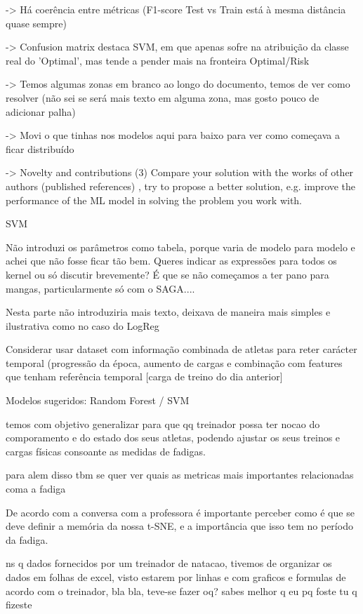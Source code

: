 \documentclass[conference]{IEEEtran}
\begin{document}
-> Há coerência entre métricas (F1-score Test vs Train está à mesma distância quase sempre)

-> Confusion matrix destaca SVM, em que apenas sofre na atribuição da classe real do 'Optimal', mas tende a pender mais na fronteira Optimal/Risk

-> Temos algumas zonas em branco ao longo do documento, temos de ver como resolver (não sei se será mais texto em alguma zona, mas gosto pouco de adicionar palha)

-> Movi o que tinhas nos modelos aqui para baixo para ver como começava a ficar distribuído

-> Novelty and contributions (3) Compare your solution with the works of other authors (published references) , try to propose a better solution, e.g. improve the performance of the ML model in solving the problem you work with.

SVM

Não introduzi os parâmetros como tabela, porque varia de modelo para modelo e achei que não fosse ficar tão bem. Queres indicar as expressões para todos os kernel ou só discutir brevemente? É que se não começamos a ter pano para mangas, particularmente só com o SAGA....

Nesta parte não introduziria mais texto, deixava de maneira mais simples e ilustrativa como no caso do LogReg


Considerar usar dataset com informação combinada de atletas para reter carácter temporal (progressão da época, aumento de cargas e combinação com features que tenham referência temporal [carga de treino do dia anterior]

Modelos sugeridos: Random Forest / SVM

temos com objetivo generalizar para que qq treinador possa ter nocao do comporamento e do estado dos seus atletas, podendo ajustar os seus treinos e cargas físicas consoante as medidas de fadigas.

para alem disso tbm se quer ver quais as metricas mais importantes relacionadas coma a fadiga

De acordo com a conversa com a professora é importante perceber como é que se deve definir a memória da nossa t-SNE, e a importância que isso tem no período da fadiga.

ns q dados fornecidos por um treinador de natacao, tivemos de organizar os dados em folhas de excel, visto estarem por linhas e com graficos e formulas de acordo com o treinador, bla bla, teve-se fazer oq? sabes melhor q eu pq foste tu q fizeste
\end{document}

